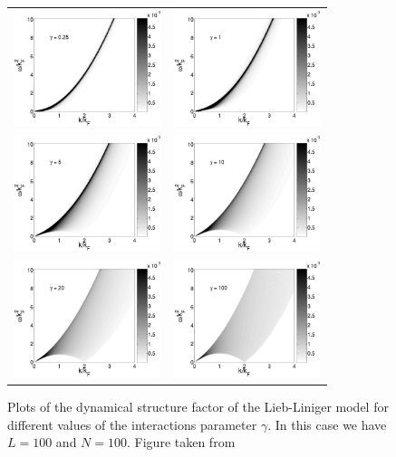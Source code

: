 \documentclass[11pt, a4paper]{report} %
\begin{document}
\begin{figure}[tb!]
  \centering
  \begin{tabular}{cc}
    \includegraphics[width=4.3cm]{c_0p25_L_100_N_100.eps}
    &
      \includegraphics[width=4.3cm]{c_1_L_100_N_100.eps} \\
    \includegraphics[width=4.3cm]{c_5_L_100_N_100.eps}
    &
      \includegraphics[width=4.3cm]{c_10_L_100_N_100.eps} \\
    \includegraphics[width=4.3cm]{c_20_L_100_N_100.eps}
    &
      \includegraphics[width=4.3cm]{c_100_L_100_N_100.eps}
  \end{tabular}
  \caption{Plots of the dynamical structure factor of the Lieb-Liniger model for different values of the interactions parameter \(\gamma\).
    In this case we have $L = 100$ and $N = 100$.
    Figure taken from~\cite{Caux2007a}}
\label{fig:lieb_density_dsf}
\end{figure}
\end{document}

